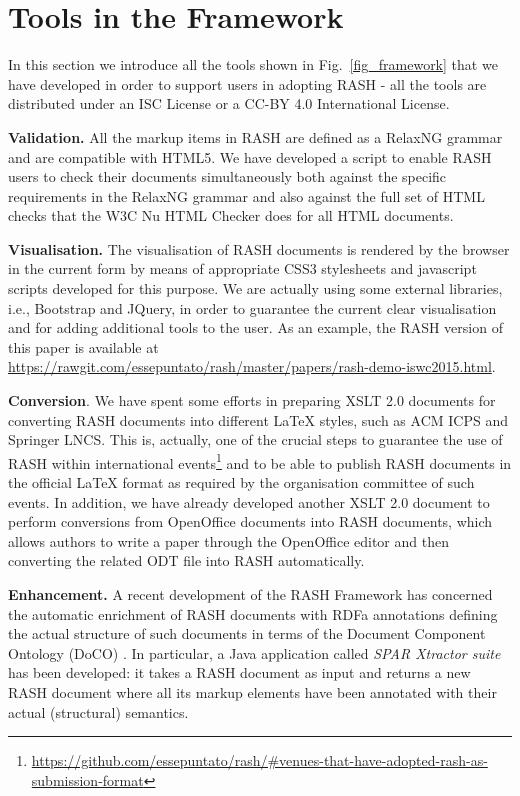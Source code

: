 \documentclass[runningheads,a4paper]{llncs}
\begin{document}
\section{Tools in the Framework}\label{sec_tools}

In this section we introduce all the tools shown in Fig.~\ref{fig_framework} that we have developed in order to support users in adopting RASH - all the tools are distributed under an ISC License or a CC-BY 4.0 International License.

{\bf Validation.} All the markup items in RASH are defined as a RelaxNG grammar and are compatible with HTML5. We have developed a script to enable RASH users to check their documents simultaneously both against the specific requirements in the RelaxNG grammar and also against the full set of HTML checks that the W3C Nu HTML Checker does for all HTML documents.

{\bf Visualisation.} The visualisation of RASH documents is rendered by the browser in the current form by means of appropriate CSS3 stylesheets and javascript scripts developed for this purpose. We are actually using some external libraries, i.e., Bootstrap and JQuery, in order to guarantee the current clear visualisation and for adding additional tools to the user. As an example, the RASH version of this paper is available at \url{https://rawgit.com/essepuntato/rash/master/papers/rash-demo-iswc2015.html}.

{\bf Conversion}. We have spent some efforts in preparing XSLT 2.0 documents for converting RASH documents into different LaTeX styles, such as ACM ICPS and Springer LNCS. This is, actually, one of the crucial steps to guarantee the use of RASH within international events\footnote{\url{https://github.com/essepuntato/rash/\#venues-that-have-adopted-rash-as-submission-format}} and to be able to publish RASH documents in the official LaTeX format as required by the organisation committee of such events. In addition, we have already developed another XSLT 2.0 document to perform conversions from OpenOffice documents into RASH documents, which allows authors to write a paper through the OpenOffice editor and then converting the related ODT file into RASH automatically.

{\bf Enhancement.} A recent development of the RASH Framework has concerned the automatic enrichment of RASH documents with RDFa annotations defining the actual structure of such documents in terms of the Document Component Ontology (DoCO) \cite{doco}. In particular, a Java application called {\em SPAR Xtractor suite} has been developed: it takes a RASH document as input and returns a new RASH document where all its markup elements have been annotated with their actual (structural) semantics.
\end{document}
